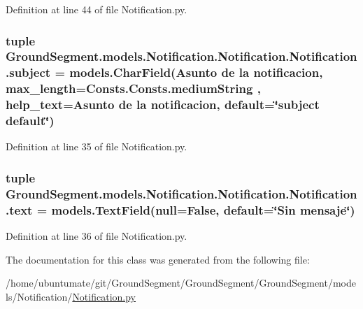 Definition at line 44 of file Notification.\+py.

\hypertarget{class_ground_segment_1_1models_1_1_notification_1_1_notification_1_1_notification_a5d4145d0ba4943ac10e0a269ea3ae54e}{}
\subsubsection[{subject}]{\setlength{\rightskip}{0pt plus 5cm}tuple Ground\+Segment.\+models.\+Notification.\+Notification.\+Notification.\+subject = models.\+Char\+Field(\textquotesingle{}Asunto de la notificacion\textquotesingle{}, max\+\_\+length={\bf Consts.\+Consts.\+medium\+String} , help\+\_\+text=\textquotesingle{}Asunto de la notificacion\textquotesingle{}, default=\char`\"{}subject default\char`\"{})\hspace{0.3cm}{\ttfamily [static]}}\label{class_ground_segment_1_1models_1_1_notification_1_1_notification_1_1_notification_a5d4145d0ba4943ac10e0a269ea3ae54e}


Definition at line 35 of file Notification.\+py.

\hypertarget{class_ground_segment_1_1models_1_1_notification_1_1_notification_1_1_notification_aab87e972d1da9172d2e7cce622b8fce3}{}
\subsubsection[{text}]{\setlength{\rightskip}{0pt plus 5cm}tuple Ground\+Segment.\+models.\+Notification.\+Notification.\+Notification.\+text = models.\+Text\+Field(null=False, default=\char`\"{}Sin mensaje\char`\"{})\hspace{0.3cm}{\ttfamily [static]}}\label{class_ground_segment_1_1models_1_1_notification_1_1_notification_1_1_notification_aab87e972d1da9172d2e7cce622b8fce3}


Definition at line 36 of file Notification.\+py.



The documentation for this class was generated from the following file\+:\begin{DoxyCompactItemize}
\item 
/home/ubuntumate/git/\+Ground\+Segment/\+Ground\+Segment/\+Ground\+Segment/models/\+Notification/\hyperlink{_notification_8py}{Notification.\+py}\end{DoxyCompactItemize}

